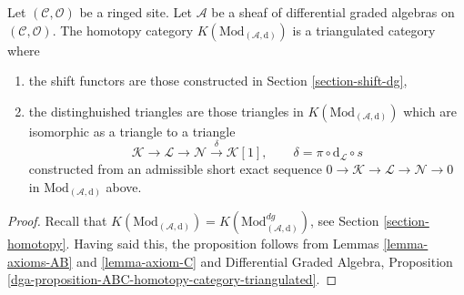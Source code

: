 \begin{proposition}
\label{proposition-homotopy-category-triangulated}
Let $(\mathcal{C}, \mathcal{O})$ be a ringed site.
Let $\mathcal{A}$ be a sheaf of differential graded algebras
on $(\mathcal{C}, \mathcal{O})$.
The homotopy category $K(\text{Mod}_{(\mathcal{A}, \text{d})})$
is a triangulated category where
\begin{enumerate}
\item the shift functors are those constructed in
Section \ref{section-shift-dg},
\item the distinghuished triangles are those triangles
in $K(\text{Mod}_{(\mathcal{A}, \text{d})})$ which are
isomorphic as a triangle to a triangle
$$
\mathcal{K} \to \mathcal{L} \to \mathcal{N}
\xrightarrow{\delta} \mathcal{K}[1],\quad\quad
\delta = \pi \circ \text{d}_\mathcal{L} \circ s
$$
constructed from an admissible short exact sequence
$0 \to \mathcal{K} \to \mathcal{L} \to \mathcal{N} \to 0$
in $\text{Mod}_{(\mathcal{A}, \text{d})}$ above.
\end{enumerate}
\end{proposition}

\begin{proof}
Recall that $K(\text{Mod}_{(\mathcal{A}, \text{d})}) =
K(\text{Mod}^{dg}_{(\mathcal{A}, \text{d})})$, see
Section \ref{section-homotopy}.
Having said this, the proposition
follows from Lemmas \ref{lemma-axioms-AB} and \ref{lemma-axiom-C}
and
Differential Graded Algebra, Proposition
\ref{dga-proposition-ABC-homotopy-category-triangulated}.
\end{proof}





























